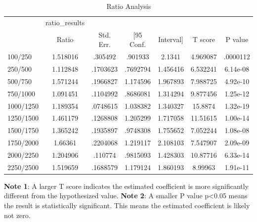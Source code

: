 \documentclass[12pt]{article}
\begin{document}
\begin{table}[h]
\centering
\caption{Ratio Analysis}
\begin{tabular}{l||c|c|cc|c|c}
\hline\hline
            &ratio\_results&            &            &            &            &            \\
            &       Ratio&   Std. Err.&  [95 Conf.&   Interval]&     T score&     P value\\
\hline
100/250     &    1.518016&     .305492&     .901933&      2.1341&    4.969087&    .0000112\\
250/500     &    1.112848&    .1703623&    .7692794&    1.456416&    6.532241&    6.14e-08\\
500/750     &    1.571244&    .1966827&    1.174596&    1.967893&    7.988725&    4.92e-10\\
750/1000    &    1.091451&    .1104992&    .8686081&    1.314294&    9.877456&    1.25e-12\\
1000/1250   &    1.189354&    .0748615&    1.038382&    1.340327&     15.8874&    1.32e-19\\
1250/1500   &    1.461179&    .1268808&    1.205299&    1.717058&    11.51615&    1.00e-14\\
1500/1750   &    1.365242&    .1935897&    .9748308&    1.755652&    7.052244&    1.08e-08\\
1750/2000   &     1.66361&    .2204068&    1.219117&    2.108103&    7.547907&    2.09e-09\\
2000/2250   &    1.204906&     .110774&    .9815093&    1.428303&    10.87716&    6.33e-14\\
2250/2500   &    1.519659&    .1688579&    1.179124&    1.860193&     8.99963&    1.91e-11\\
\hline\hline
\end{tabular}
\flushleft
\begin{footnotesize}
\begin{singlespace}
\textbf{Note 1}: A larger T score indicates the estimated coefficient is more significantly different from the hypothesized value.
\textbf{Note 2}: A smaller P value p<0.05 means the result is statistically significant. This means the estimated coefficient is likely not zero.
\end{singlespace}
\end{footnotesize}
\end{table}

\end{document}
